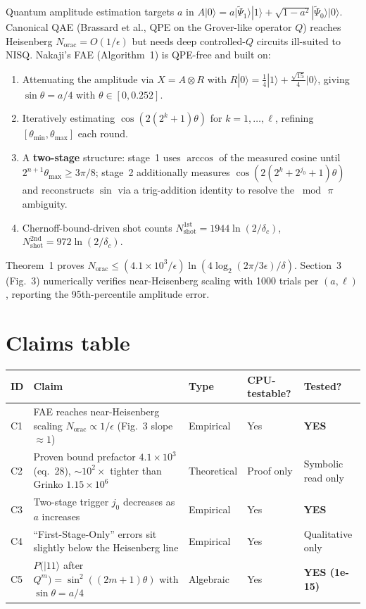 \documentclass[11pt]{article}
\begin{document}
Quantum amplitude estimation targets $a$ in
$A|0\rangle = a|\tilde{\Psi}_{1}\rangle|1\rangle + \sqrt{1-a^{2}}|\tilde{\Psi}_{0}\rangle|0\rangle$.
Canonical QAE (Brassard et al., QPE on the Grover-like operator $Q$) reaches Heisenberg $N_{\mathrm{orac}} = O(1/\epsilon)$ but needs deep controlled-$Q$ circuits ill-suited to NISQ. Nakaji's FAE (Algorithm~1) is QPE-free and built on:
\begin{enumerate}
    \item Attenuating the amplitude via $X = A \otimes R$ with $R|0\rangle = \tfrac{1}{4}|1\rangle + \tfrac{\sqrt{15}}{4}|0\rangle$, giving $\sin\theta = a/4$ with $\theta \in [0, 0.252]$.
    \item Iteratively estimating $\cos(2(2^{k}+1)\theta)$ for $k = 1,\dots,\ell$, refining $[\theta_{\min}, \theta_{\max}]$ each round.
    \item A \textbf{two-stage} structure: stage~1 uses $\arccos$ of the measured cosine until $2^{n+1}\theta_{\max} \geq 3\pi/8$; stage~2 additionally measures $\cos(2(2^{k}+2^{j_{0}}+1)\theta)$ and reconstructs $\sin$ via a trig-addition identity to resolve the $\bmod\,\pi$ ambiguity.
    \item Chernoff-bound-driven shot counts $N_{\mathrm{shot}}^{1\mathrm{st}} = 1944\ln(2/\delta_{c})$, $N_{\mathrm{shot}}^{2\mathrm{nd}} = 972\ln(2/\delta_{c})$.
\end{enumerate}
Theorem~1 proves $N_{\mathrm{orac}} \leq (4.1\times 10^{3}/\epsilon)\ln(4\log_{2}(2\pi/3\epsilon)/\delta)$. Section~3 (Fig.~3) numerically verifies near-Heisenberg scaling with 1000 trials per $(a,\ell)$, reporting the 95th-percentile amplitude error.

\section{Claims table}

\begin{longtable}{p{0.6cm} p{7cm} p{2.5cm} p{2cm} p{2cm}}
\toprule
ID & Claim & Type & CPU-testable? & Tested? \\
\midrule
C1 & FAE reaches near-Heisenberg scaling $N_{\mathrm{orac}} \propto 1/\epsilon$ (Fig.~3 slope $\approx 1$) & Empirical & Yes & \textbf{YES} \\
C2 & Proven bound prefactor $4.1\times 10^{3}$ (eq.~28), $\sim 10^{2}\times$ tighter than Grinko $1.15\times 10^{6}$ & Theoretical & Proof only & Symbolic read only \\
C3 & Two-stage trigger $j_{0}$ decreases as $a$ increases & Empirical & Yes & \textbf{YES} \\
C4 & ``First-Stage-Only'' errors sit slightly below the Heisenberg line & Empirical & Yes & Qualitative only \\
C5 & $P(|11\rangle$ after $Q^{m}) = \sin^{2}((2m+1)\theta)$ with $\sin\theta = a/4$ & Algebraic & Yes & \textbf{YES (1e-15)} \\
\bottomrule
\end{longtable}
\end{document}
